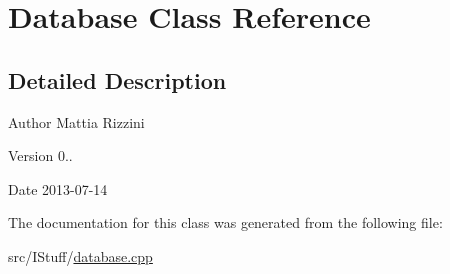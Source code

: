 \hypertarget{class_database}{\section{Database Class Reference}
\label{class_database}
}


\subsection{Detailed Description}
\begin{DoxyAuthor}{Author}
Mattia Rizzini 
\end{DoxyAuthor}
\begin{DoxyVersion}{Version}
0.. 
\end{DoxyVersion}
\begin{DoxyDate}{Date}
2013-\/07-\/14 
\end{DoxyDate}


The documentation for this class was generated from the following file\-:\begin{DoxyCompactItemize}
\item 
src/\-I\-Stuff/\hyperlink{database_8cpp}{database.\-cpp}\end{DoxyCompactItemize}

